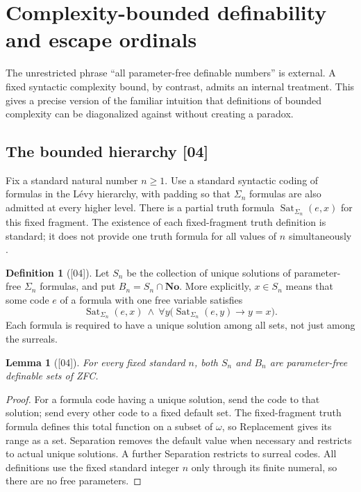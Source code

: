 \documentclass[11pt,a4paper]{article}
\numberwithin{equation}{section}
\newtheorem{lemma}[lemma]{Lemma}
\theoremstyle{definition}
\newtheorem{definition}[definition]{Definition}
\theoremstyle{remark}
\newcommand{\No}{\mathbf{No}}
\newcommand{\Sat}{\operatorname{Sat}}
\newcommand{\src}[1]{\textup{\textsf{\small[#1]}}}
\begin{document}
\section{Complexity-bounded definability and escape ordinals}
\label{dsn:sec:complexity}

The unrestricted phrase ``all parameter-free definable numbers'' is
external. A fixed syntactic complexity bound, by contrast, admits an
internal treatment. This gives a precise version of the familiar
intuition that definitions of bounded complexity can be diagonalized
against without creating a paradox.

\subsection{The bounded hierarchy \src{04}}

Fix a standard natural number $n\geq1$. Use a standard syntactic
coding of formulas in the L\'evy hierarchy, with padding so that
$\Sigma_n$ formulas are also admitted at every higher level. There
is a partial truth formula $\Sat_{\Sigma_n}(e,x)$ for this fixed
fragment. The existence of each fixed-fragment truth definition is
standard; it does not provide one truth formula for all values of
$n$ simultaneously \cite{Jech,HLR}.

\begin{definition}[\src{04}]
Let $S_n$ be the collection of unique solutions of parameter-free
$\Sigma_n$ formulas, and put $B_n=S_n\cap\No$. More explicitly,
$x\in S_n$ means that some code $e$ of a formula with one free
variable satisfies
\[
 \Sat_{\Sigma_n}(e,x)\ \wedge\
 \forall y\bigl(\Sat_{\Sigma_n}(e,y)\longrightarrow y=x\bigr).
\]
Each formula is required to have a unique solution among all sets,
not just among the surreals.
\end{definition}

\begin{lemma}[\src{04}]
For every fixed standard $n$, both $S_n$ and $B_n$ are
parameter-free definable sets of ZFC.
\end{lemma}
\begin{proof}
For a formula code having a unique solution, send the code to that
solution; send every other code to a fixed default set. The
fixed-fragment truth formula defines this total function on a subset
of $\omega$, so Replacement gives its range as a set. Separation
removes the default value when necessary and restricts to actual
unique solutions. A further Separation restricts to surreal codes.
All definitions use the fixed standard integer $n$ only through its
finite numeral, so there are no free parameters.
\end{proof}
\end{document}
